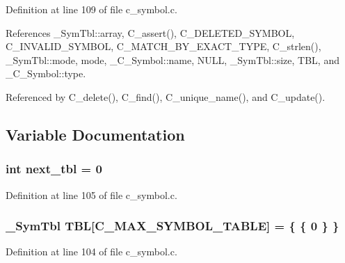 Definition at line 109 of file c\_\-symbol.c.

References \_\-Sym\-Tbl::array, C\_\-assert(), C\_\-DELETED\_\-SYMBOL, C\_\-INVALID\_\-SYMBOL, C\_\-MATCH\_\-BY\_\-EXACT\_\-TYPE, C\_\-strlen(), \_\-Sym\-Tbl::mode, mode, \_\-C\_\-Symbol::name, NULL, \_\-Sym\-Tbl::size, TBL, and \_\-C\_\-Symbol::type.

Referenced by C\_\-delete(), C\_\-find(), C\_\-unique\_\-name(), and C\_\-update().

\subsection{Variable Documentation}
\subsubsection{\setlength{\rightskip}{0pt plus 5cm}int \bf{next\_\-tbl} = 0\hspace{0.3cm}{\tt  [static]}}\label{c__symbol_8c_8f6d5fcc8b0f003fcb0ac869a190bc2f}




Definition at line 105 of file c\_\-symbol.c.
\subsubsection{\setlength{\rightskip}{0pt plus 5cm}\bf{\_\-Sym\-Tbl} \bf{TBL}[C\_\-MAX\_\-SYMBOL\_\-TABLE] = \{ \{ 0 \} \}}\label{c__symbol_8c_46b7c6724daa2c733e85cd7a6fde560a}




Definition at line 104 of file c\_\-symbol.c.